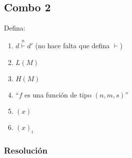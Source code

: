 \documentclass[
]{article}
\providecommand{\tightlist}{%
  \setlength{\itemsep}{0pt}\setlength{\parskip}{0pt}}
\begin{document}
\subsection{Combo 2}\label{combo-2}

Defina:

\begin{enumerate}
\def\labelenumi{\arabic{enumi}.}
\tightlist
\item
  \(d\overset{n}{\vdash}d'\) (no hace falta que defina \(\vdash\))
\item
  \(L(M)\)
\item
  \(H(M)\)
\item
  ``\(f\) es una función de tipo \((n,m,s)\)''
\item
  \((x)\)
\item
  \((x)_i\)
\end{enumerate}

\subsubsection{Resolución}\label{resoluciuxf3n-1}
\end{document}
